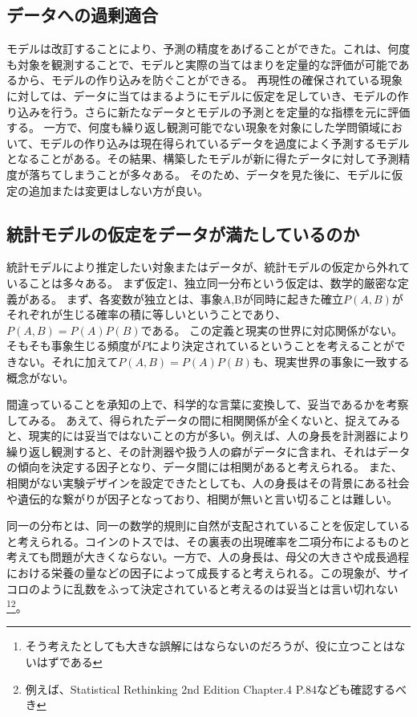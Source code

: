 \subsection{データへの過剰適合}
モデルは改訂することにより、予測の精度をあげることができた。これは、何度も対象を観測することで、モデルと実際の当てはまりを定量的な評価が可能であるから、モデルの作り込みを防ぐことができる。
再現性の確保されている現象に対しては、データに当てはまるようにモデルに仮定を足していき、モデルの作り込みを行う。さらに新たなデータとモデルの予測とを定量的な指標を元に評価する。
一方で、何度も繰り返し観測可能でない現象を対象にした学問領域において、モデルの作り込みは現在得られているデータを過度によく予測するモデルとなることがある。その結果、構築したモデルが新に得たデータに対して予測精度が落ちてしまうことが多々ある。
そのため、データを見た後に、モデルに仮定の追加または変更はしない方が良い。




\subsection{統計モデルの仮定をデータが満たしているのか}
統計モデルにより推定したい対象またはデータが、統計モデルの仮定から外れていることは多々ある。
まず仮定1、独立同一分布という仮定は、数学的厳密な定義がある。
まず、各変数が独立とは、事象A,Bが同時に起きた確立$P(A,B)$がそれぞれが生じる確率の積に等しいということであり、$P(A,B)=P(A)P(B)$である。
この定義と現実の世界に対応関係がない。
そもそも事象生じる頻度が$P$により決定されているということを考えることができない。それに加えて$P(A,B)=P(A)P(B)$も、現実世界の事象に一致する概念がない。

間違っていることを承知の上で、科学的な言葉に変換して、妥当であるかを考察してみる。
あえて、得られたデータの間に相関関係が全くないと、捉えてみると、現実的には妥当ではないことの方が多い。例えば、人の身長を計測器により繰り返し観測すると、その計測器や扱う人の癖がデータに含まれ、それはデータの傾向を決定する因子となり、データ間には相関があると考えられる。
また、相関がない実験デザインを設定できたとしても、人の身長はその背景にある社会や遺伝的な繋がりが因子となっており、相関が無いと言い切ることは難しい。

同一の分布とは、同一の数学的規則に自然が支配されていることを仮定していると考えられる。コインのトスでは、その裏表の出現確率を二項分布によるものと考えても問題が大きくならない。一方で、人の身長は、母父の大きさや成長過程における栄養の量などの因子によって成長すると考えられる。この現象が、サイコロのように乱数をふって決定されていると考えるのは妥当とは言い切れない\footnote{そう考えたとしても大きな誤解にはならないのだろうが、役に立つことはないはずである}\footnote{例えば、Statistical Rethinking 2nd Edition Chapter.4 P.84なども確認するべき}。

